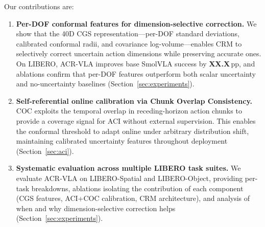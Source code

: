 Our contributions are:
\begin{enumerate}[leftmargin=*,nosep]
  \item \textbf{Per-DOF conformal features for dimension-selective correction.}
  We show that the 40D CGS representation---per-DOF standard deviations, calibrated conformal radii, and covariance log-volume---enables CRM to selectively correct uncertain action dimensions while preserving accurate ones.
  On LIBERO, ACR-VLA improves base SmolVLA success by \textbf{XX.X}\,pp, and ablations confirm that per-DOF features outperform both scalar uncertainty and no-uncertainty baselines (Section~\ref{sec:experiments}).

  \item \textbf{Self-referential online calibration via Chunk Overlap Consistency.}
  COC exploits the temporal overlap in receding-horizon action chunks to provide a coverage signal for ACI without external supervision.
  This enables the conformal threshold to adapt online under arbitrary distribution shift, maintaining calibrated uncertainty features throughout deployment (Section~\ref{sec:aci}).

  \item \textbf{Systematic evaluation across multiple LIBERO task suites.}
  We evaluate ACR-VLA on LIBERO-Spatial and LIBERO-Object, providing per-task breakdowns, ablations isolating the contribution of each component (CGS features, ACI+COC calibration, CRM architecture), and analysis of when and why dimension-selective correction helps (Section~\ref{sec:experiments}).
\end{enumerate}
